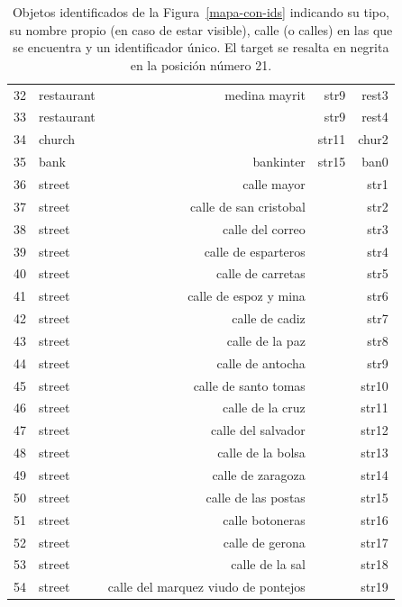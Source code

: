 \begin{table}[H]
{\begin{center}
\begin{tabular}{|c|l|r|r|r|}
32&restaurant & medina mayrit & str9 & rest3\\
33&restaurant & & str9 & rest4\\
34&church & & str11 & chur2\\
35&bank & bankinter & str15 & ban0\\
36&street & calle mayor & & str1 \\
37&street & calle de san cristobal & & str2\\
38&street & calle del correo & & str3\\
39&street & calle de esparteros & & str4\\
40&street & calle de carretas & & str5\\
41&street & calle de espoz y mina & & str6\\
42&street & calle de cadiz & & str7\\
43&street & calle de la paz & & str8\\
44&street & calle de antocha & & str9\\
45&street & calle de santo tomas & & str10\\
46&street & calle de la cruz & & str11\\
47&street & calle del salvador & & str12\\
48&street & calle de la bolsa & & str13\\
49&street & calle de zaragoza & & str14\\
50&street & calle de las postas & & str15\\
51&street & calle botoneras & & str16\\
52&street & calle de gerona & & str17\\
53&street & calle de la sal & & str18\\
54&street & calle del marquez viudo de pontejos & & str19\\
\hline
\end{tabular}
\caption{Objetos identificados de la Figura~\ref{mapa-con-ids} indicando su tipo, su nombre propio (en caso de estar visible), calle (o calles) en las que se encuentra y un identificador \'unico. El target se resalta en negrita en la posici\'on n\'umero 21.\label{tabla-ids}}
\end{center}
}
\end{table}




